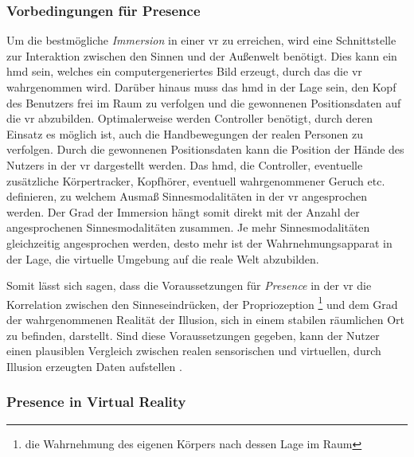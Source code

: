\documentclass[a4paper,11pt]{article}%
\renewcommand{\\}{\vspace*{0.5\baselineskip} \newline}
\begin{document}
		\subsubsection{Vorbedingungen für Presence}
Um die bestmögliche \textit{Immersion} in einer \ac{vr} zu erreichen, wird eine Schnittstelle zur Interaktion zwischen den Sinnen und der Außenwelt benötigt. Dies kann ein \ac{hmd} sein, welches ein computergeneriertes Bild erzeugt, durch das die \ac{vr} wahrgenommen wird. Darüber hinaus muss das \ac{hmd} in der Lage sein, den Kopf des Benutzers frei im Raum zu verfolgen und die gewonnenen Positionsdaten auf die \ac{vr} abzubilden. Optimalerweise werden Controller benötigt, durch deren Einsatz es möglich ist, auch die Handbewegungen der realen Personen zu verfolgen. Durch die gewonnenen Positionsdaten kann die Position der Hände des Nutzers in der \ac{vr} dargestellt werden. Das \ac{hmd}, die Controller, eventuelle zusätzliche Körpertracker, Kopfhörer, eventuell wahrgenommener Geruch etc. definieren, zu welchem Ausmaß Sinnesmodalitäten in der \ac{vr} angesprochen werden. Der Grad der Immersion hängt somit direkt mit der Anzahl der angesprochenen Sinnesmodalitäten zusammen. Je mehr Sinnesmodalitäten gleichzeitig angesprochen werden, desto mehr ist der Wahrnehmungsapparat in der Lage, die virtuelle Umgebung auf die reale Welt abzubilden.

Somit lässt sich sagen, dass die Voraussetzungen für \textit{Presence} in der \ac{vr} die Korrelation zwischen den Sinneseindrücken, der Propriozeption \footnote{die Wahrnehmung des eigenen Körpers nach dessen Lage im Raum} und dem Grad der wahrgenommenen Realität der Illusion, sich in einem stabilen räumlichen Ort zu befinden, darstellt. Sind diese Voraussetzungen gegeben, kann der Nutzer einen plausiblen Vergleich zwischen realen sensorischen und virtuellen, durch Illusion erzeugten Daten aufstellen \citep{slater2009we}.

		\subsubsection{Presence in Virtual Reality}
			
\end{document}
